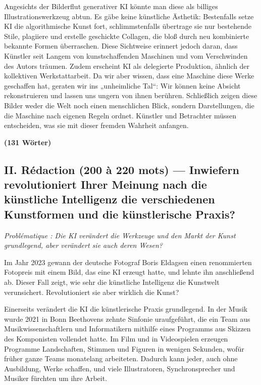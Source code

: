 \documentclass[11pt,a4paper]{article}
\begin{document}
Angesichts der Bilderflut generativer KI könnte man diese als billiges Illustrationswerkzeug abtun. Es gäbe keine künstliche Ästhetik: Bestenfalls setze KI die algorithmische Kunst fort, schlimmstenfalls übertrage sie nur bestehende Stile, plagiiere und erstelle geschickte Collagen, die bloß durch neu kombinierte bekannte Formen überraschen. Diese Sichtweise erinnert jedoch daran, dass Künstler seit Langem von kunstschaffenden Maschinen und vom Verschwinden des Autors träumen. Zudem erscheint KI als delegierte Produktion, ähnlich der kollektiven Werkstattarbeit. Da wir aber wissen, dass eine Maschine diese Werke geschaffen hat, geraten wir ins „unheimliche Tal``: Wir können keine Absicht rekonstruieren und lassen uns ungern von ihnen berühren. Schließlich zeigen diese Bilder weder die Welt noch einen menschlichen Blick, sondern Darstellungen, die die Maschine nach eigenen Regeln ordnet. Künstler und Betrachter müssen entscheiden, was sie mit dieser fremden Wahrheit anfangen.

\textbf{(131 Wörter)}

\hypertarget{ii.-ruxe9daction-200-uxe0-220-mots-inwiefern-revolutioniert-ihrer-meinung-nach-die-kuxfcnstliche-intelligenz-die-verschiedenen-kunstformen-und-die-kuxfcnstlerische-praxis}{%
\subsection{II. Rédaction (200 à 220 mots) --- Inwiefern revolutioniert Ihrer Meinung nach die künstliche Intelligenz die verschiedenen Kunstformen und die künstlerische Praxis?}\label{ii.-ruxe9daction-200-uxe0-220-mots-inwiefern-revolutioniert-ihrer-meinung-nach-die-kuxfcnstliche-intelligenz-die-verschiedenen-kunstformen-und-die-kuxfcnstlerische-praxis}}

\emph{Problématique : Die KI verändert die Werkzeuge und den Markt der Kunst grundlegend, aber verändert sie auch deren Wesen?}

Im Jahr 2023 gewann der deutsche Fotograf Boris Eldagsen einen renommierten Fotopreis mit einem Bild, das eine KI erzeugt hatte, und lehnte ihn anschließend ab. Dieser Fall zeigt, wie sehr die künstliche Intelligenz die Kunstwelt verunsichert. Revolutioniert sie aber wirklich die Kunst?

Einerseits verändert die KI die künstlerische Praxis grundlegend. In der Musik wurde 2021 in Bonn Beethovens zehnte Sinfonie uraufgeführt, die ein Team aus Musikwissenschaftlern und Informatikern mithilfe eines Programms aus Skizzen des Komponisten vollendet hatte. Im Film und in Videospielen erzeugen Programme Landschaften, Stimmen und Figuren in wenigen Sekunden, wofür früher ganze Teams monatelang arbeiteten. Dadurch kann jeder, auch ohne Ausbildung, Werke schaffen, und viele Illustratoren, Synchronsprecher und Musiker fürchten um ihre Arbeit.
\end{document}
